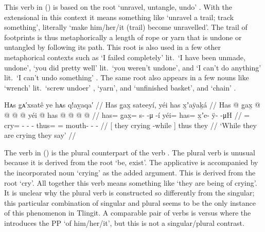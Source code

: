 This verb  in (\lastx) is based on the root  ‘unravel, untangle, undo’ \parencites[f06/53–56]{leer:1973}[695–697]{leer:1976}.
With the extensional  in this context it means something like ‘unravel a trail; track something’, literally ‘make him/her/it (trail) become unravelled’.
The trail of footprints is thus metaphorically a length of rope or yarn that is undone or untangled by following its path.
This root is also used in a few other metaphorical contexts such as  ‘I failed completely’ lit.\ ‘I have been unmade, undone’,  ‘you did pretty well’ lit.\ ‘you weren’t undone’, and  ‘I can’t do anything’ lit.\ ‘I can’t undo something’ \parencite[f06/56]{leer:1973}.
The same root also appears in a few nouns like  ‘wrench’ lit.\ ‘screw undoer’ \parencite[f06/53]{leer:1973},  ‘yarn’, and  ‘unfinished basket’, and  ‘chain’ \parencite[f06/55]{leer:1973}.

\ex\label{ex:100-30-crying-say}%
%
\begingl
	\glpreamble	Hᴀs g̣ᴀ′xsatê ye hᴀs q!aỵaqa′ //
	\glpreamble	Has g̱ax̱ sateeyí, yéi has x̱ʼaÿaḵá //
	\gla	{} Has @ g̱ax̱ @  @ {} @ {} @ {} {}
		yéi @ has @  @ {} @ {} @ {} //
	\glb	{} has= g̱ax̱= s-  -μ -í {}
		yéi= has= x̱ʼe- ÿ-  -μH //
	\glc	{} = cry= -  - - {}
		thus= = mouth- -  - //
	\gld	{}[ they crying  {} {} -while {}]
		thus they  {} {} {} //
	\glft	‘While they are crying they say’
		//
\endgl
\xe

The verb  in (\lastx) is the plural counterpart of the verb .
The plural verb is unusual because it is derived from the root  ‘be, exist’.
The applicative  is accompanied by the incorporated noun  ‘crying’ as the added argument.
This  is derived from the root  ‘cry’.
All together this verb means something like ‘they are being of crying’.
It is unclear why the plural verb is constructed so differently from the singular; this particular combination of singular and plural seems to be the only instance of this phenomenon in Tlingit.
A comparable pair of verbs is  versus  where the  introduces the PP  ‘of him/her/it’, but this is not a singular/plural contrast.

